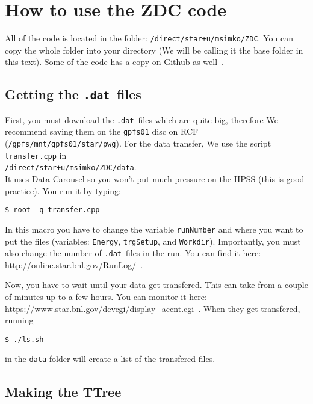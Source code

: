 \section{How to use the ZDC code}\hypertarget{how-to-use-the-zdc-code}{}\label{how-to-use-the-zdc-code}

All of the code is located in the folder: \texttt{/direct/star+u/msimko/ZDC}. You can copy the whole folder into
your directory (We will be calling it the base folder in this text). Some of the code has
a copy on Github as well~\cite{ZdcGithubRepo}.

\subsection{Getting the \verb=.dat=\ files}\hypertarget{getting-the-dat-files}{}\label{getting-the-dat-files}

First, you must download the \verb=.dat=\ files which are quite big, therefore We recommend saving them on
the \texttt{gpfs01} disc on RCF (\texttt{/gpfs/mnt/gpfs01/star/pwg}). For the data transfer, We use the script
\texttt{transfer.cpp} in\\
\texttt{/direct/star+u/msimko/ZDC/data}.\\
It uses Data Carousel so you won't put much
pressure on the HPSS (this is good practice). You run it by typing:
\begin{verbatim}
$ root -q transfer.cpp
\end{verbatim}
In this macro you have to change the variable
\texttt{runNumber} and where you want to put the files (variables: \texttt{Energy}, \texttt{trgSetup}, 
and \texttt{Workdir}).
Importantly, you must also change the number of \verb=.dat=\ files in the run. You can find it here:
\url{http://online.star.bnl.gov/RunLog/}~\cite{runLogBrowser}.

Now, you have to wait until your data get transfered. This can take from a couple of minutes up to a few hours.
You can monitor it here:
\url{https://www.star.bnl.gov/devcgi/display_accnt.cgi}~\cite{hpss}.
When they get transfered, running
\begin{verbatim}
$ ./ls.sh
\end{verbatim}
in the \texttt{data} folder will create a list of the transfered files.

\subsection{Making the TTree}\hypertarget{making-the-ttree}{}\label{making-the-ttree}

